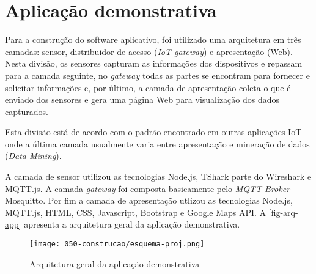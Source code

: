 \chapter{Aplicação demonstrativa}
\label{chap:aplicacao_demonstrativa}

Para a construção do software aplicativo, foi utilizado uma arquitetura em
três camadas: sensor, distribuidor de acesso (\emph{IoT gateway}) e apresentação
(Web). Nesta divisão, os sensores capturam as informações dos dispositivos
e repassam para a camada seguinte, no \emph{gateway} todas as partes se
encontram para fornecer e solicitar informações e, por último, a camada de
apresentação coleta o que é enviado dos sensores e gera uma página Web
para visualização dos dados capturados.

Esta divisão está de acordo com o padrão encontrado em outras aplicações
IoT onde a última camada usualmente varia entre apresentação e mineração
de dados (\emph{Data Mining}).

A camada de sensor utilizou as tecnologias Node.js, TShark parte
do Wireshark e MQTT.js. A camada \emph{gateway} foi composta
basicamente pelo \emph{MQTT Broker} Mosquitto. Por fim a camada de
apresentação utlizou as tecnologias Node.js, MQTT.js, HTML,
CSS, Javascript, Bootstrap e Google Maps API. A \autoref{fig-arq-app} apresenta
a arquitetura geral da aplicação demonstrativa.

\begin{figure}[htb]
	\caption{\label{fig-arq-app}Arquitetura geral da aplicação demonstrativa}
	\begin{center}
		\texttt{[image: 050-construcao/esquema-proj.png]}
	\end{center}
\end{figure}
